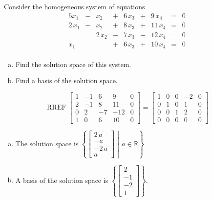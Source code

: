 
\begin{exerciseStatement}


Consider the homogeneous system of equations 
\begin{alignat*}{5} x_{1} &-& x_{2} &+& 6 \, x_{3} &+& 9 \, x_{4} &=& 0 \\2 \, x_{1} &-& x_{2} &+& 8 \, x_{3} &+& 11 \, x_{4} &=& 0 \\ & & 2 \, x_{2} &-& 7 \, x_{3} &-& 12 \, x_{4} &=& 0 \\x_{1} & &  &+& 6 \, x_{3} &+& 10 \, x_{4} &=& 0 \\ \end{alignat*}
            


\begin{enumerate}[(a)]
\item  Find the solution space of this system.
\item  Find a basis of the solution space.
\end{enumerate}
    
\end{exerciseStatement}
    
\begin{exerciseAnswer} 


\[\operatorname{RREF} \left[\begin{array}{cccc|c}
1 & -1 & 6 & 9 & 0 \\
2 & -1 & 8 & 11 & 0 \\
0 & 2 & -7 & -12 & 0 \\
1 & 0 & 6 & 10 & 0
\end{array}\right] = \left[\begin{array}{cccc|c}
1 & 0 & 0 & -2 & 0 \\
0 & 1 & 0 & 1 & 0 \\
0 & 0 & 1 & 2 & 0 \\
0 & 0 & 0 & 0 & 0
\end{array}\right] \]


\begin{enumerate}[(a)]
\item The solution space is \( \left\{ \left[\begin{array}{c}
2 \, a \\
-a \\
-2 \, a \\
a
\end{array}\right] \middle|\,a\in\mathbb{R}\right\} \)
\item A basis of the solution space is \( \left\{ \left[\begin{array}{c}
2 \\
-1 \\
-2 \\
1
\end{array}\right] \right\} \).
\end{enumerate}
    
\end{exerciseAnswer}
    
